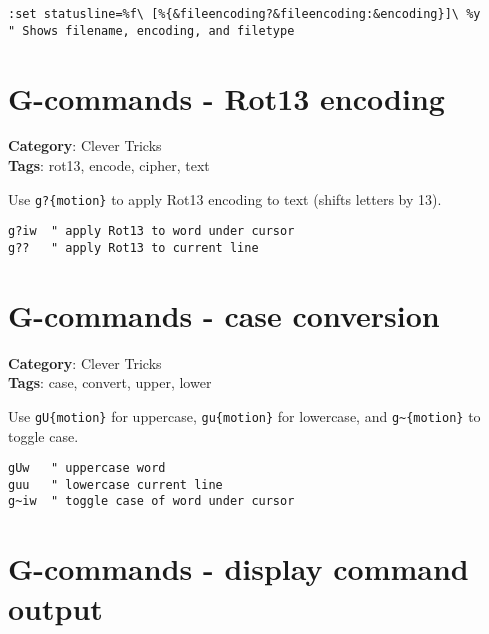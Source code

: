 {{\begin{Exa*}{}
\begin{Verbatim}[fontsize=\footnotesize, breaklines, breakanywhere]
:set statusline=%f\ [%{&fileencoding?&fileencoding:&encoding}]\ %y
" Shows filename, encoding, and filetype
\end{Verbatim}
\end{Exa*}

\section{G-commands - Rot13 encoding}

\textbf{Category}: Clever Tricks\\ \textbf{Tags}: rot13, encode, cipher, text
\vspace{0.5cm}

Use {\footnotesize \Verb§g?{motion}§} to apply Rot13 encoding to text (shifts letters by 13).

\begin{Exa*}{}
\begin{Verbatim}[fontsize=\footnotesize, breaklines, breakanywhere]
g?iw  " apply Rot13 to word under cursor
g??   " apply Rot13 to current line
\end{Verbatim}
\end{Exa*}

\section{G-commands - case conversion}

\textbf{Category}: Clever Tricks\\ \textbf{Tags}: case, convert, upper, lower
\vspace{0.5cm}

Use {\footnotesize \Verb§gU{motion}§} for uppercase, {\footnotesize \Verb§gu{motion}§} for lowercase, and {\footnotesize \Verb§g~{motion}§} to toggle case.

\begin{Exa*}{}
\begin{Verbatim}[fontsize=\footnotesize, breaklines, breakanywhere]
gUw   " uppercase word
guu   " lowercase current line
g~iw  " toggle case of word under cursor
\end{Verbatim}
\end{Exa*}

\section{G-commands - display command output}

}}
